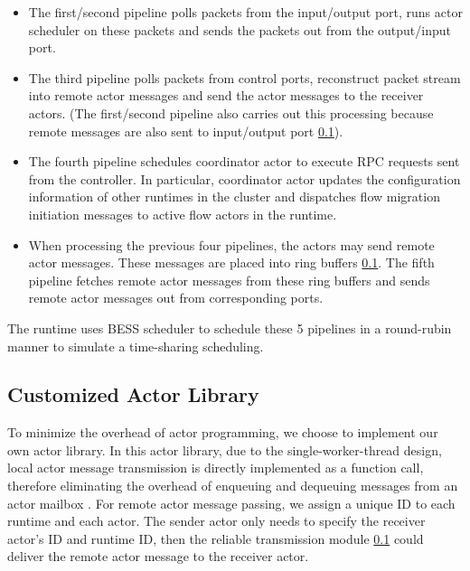 \begin{itemize}

\item The first/second pipeline polls packets from the input/output port, runs actor scheduler on these packets and sends the packets out from the output/input port.

\item The third pipeline polls packets from control ports, reconstruct packet stream into remote actor messages and send the actor messages to the receiver actors. (The first/second pipeline also carries out this processing because remote messages are also sent to input/output port \ref{}).

\item The fourth pipeline schedules coordinator actor to execute RPC requests sent from the controller. In particular, coordinator actor updates the configuration information of other runtimes in the cluster and dispatches flow migration initiation messages to active flow actors in the runtime.

\item When processing the previous four pipelines, the actors may send remote actor messages. These messages are placed into ring buffers \ref{}. The fifth pipeline fetches remote actor messages from these ring buffers and sends remote actor messages out from corresponding ports.

\end{itemize}

The runtime uses BESS scheduler to schedule these 5 pipelines in a round-rubin manner to simulate a time-sharing scheduling.

\subsection{Customized Actor Library}

To minimize the overhead of actor programming, we choose to implement our own actor library. In this actor library, due to the single-worker-thread design, local actor message transmission is directly implemented as a function call, therefore eliminating the overhead of enqueuing and dequeuing messages from an actor mailbox \cite{}. For remote actor message passing, we assign a unique ID to each runtime and each actor. The sender actor only needs to specify the receiver actor's ID and runtime ID, then the reliable transmission module \ref{} could deliver the remote actor message to the receiver actor.

